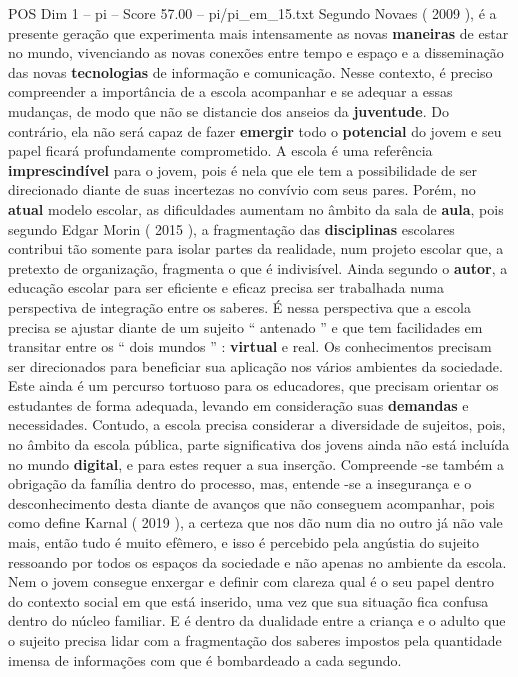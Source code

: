 \begin{textsample}{POS Dim 1 – pi – Score 57.00 – pi/pi\_em\_15.txt}
Segundo Novaes ( 2009 ), é a presente geração que experimenta mais intensamente as novas \textbf{maneiras} de estar no mundo, vivenciando as novas conexões entre tempo e espaço e a disseminação das novas \textbf{tecnologias} de informação e comunicação.
Nesse contexto, é preciso compreender a importância de a escola acompanhar e se adequar a essas mudanças, de modo que não se distancie dos anseios da \textbf{juventude}.
Do contrário, ela não será capaz de fazer \textbf{emergir} todo o \textbf{potencial} do jovem e seu papel ficará profundamente comprometido.
A escola é uma referência \textbf{imprescindível} para o jovem, pois é nela que ele tem a possibilidade de ser direcionado diante de suas incertezas no convívio com seus pares.
Porém, no \textbf{atual} modelo escolar, as dificuldades aumentam no âmbito da sala de \textbf{aula}, pois segundo Edgar Morin ( 2015 ), a fragmentação das \textbf{disciplinas} escolares contribui tão somente para isolar partes da realidade, num projeto escolar que, a pretexto de organização, fragmenta o que é indivisível.
Ainda segundo o \textbf{autor}, a educação escolar para ser eficiente e eficaz precisa ser trabalhada numa perspectiva de integração entre os saberes.
É nessa perspectiva que a escola precisa se ajustar diante de um sujeito “ antenado ” e que tem facilidades em transitar entre os “ dois mundos ” : \textbf{virtual} e real.
Os conhecimentos precisam ser direcionados para beneficiar sua aplicação nos vários ambientes da sociedade.
Este ainda é um percurso tortuoso para os educadores, que precisam orientar os estudantes de forma adequada, levando em consideração suas \textbf{demandas} e necessidades.
Contudo, a escola precisa considerar a diversidade de sujeitos, pois, no âmbito da escola pública, parte significativa dos jovens ainda não está incluída no mundo \textbf{digital}, e para estes requer a sua inserção.
Compreende -se também a obrigação da família dentro do processo, mas, entende -se a insegurança e o desconhecimento desta diante de avanços que não conseguem acompanhar, pois como define Karnal ( 2019 ), a certeza que nos dão num dia no outro já não vale mais, então tudo é muito efêmero, e isso é percebido pela angústia do sujeito ressoando por todos os espaços da sociedade e não apenas no ambiente da escola.
Nem o jovem consegue enxergar e definir com clareza qual é o seu papel dentro do contexto social em que está inserido, uma vez que sua situação fica confusa dentro do núcleo familiar.
E é dentro da dualidade entre a criança e o adulto que o sujeito precisa lidar com a fragmentação dos saberes impostos pela quantidade imensa de informações com que é bombardeado a cada segundo.

\end{textsample}
